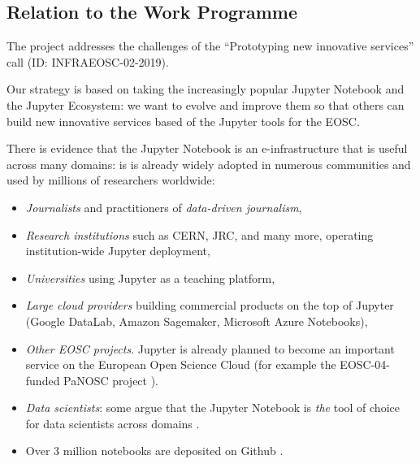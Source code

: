 \subsection{Relation to the Work Programme}

The \TheProject project addresses the challenges of the ``Prototyping
new innovative services'' call (ID: INFRAEOSC-02-2019).

Our strategy is based on taking the increasingly popular Jupyter
Notebook and the Jupyter Ecosystem: we want to evolve and improve them
so that others can build new innovative services based of the Jupyter
tools for the EOSC.
\medskip

There is evidence that the Jupyter Notebook is an e-infrastructure
that is useful across many domains: is is already widely adopted in
numerous communities and used by millions of researchers worldwide:
\begin{itemize}
\item \emph{Journalists} and practitioners of \emph{data-driven
    journalism},
\item \emph{Research institutions} such as CERN, JRC, and many more,
  operating institution-wide Jupyter deployment,
\item \emph{Universities} using Jupyter as a teaching platform,
\item \emph{Large cloud providers} building commercial products on the
  top of Jupyter (Google DataLab, Amazon Sagemaker, Microsoft Azure
  Notebooks),
\item \emph{Other EOSC projects}. Jupyter is already planned to become
  an important service on the European Open Science Cloud (for example
  the EOSC-04-funded PaNOSC project \cite{panosc}).
\item \emph{Data scientists}: some argue that the Jupyter Notebook is
  \emph{the} tool of choice for data scientists across domains
  \cite{Perkel2018}.
\item Over 3 million notebooks are deposited on Github \cite{notebookcount}.
\end{itemize}





